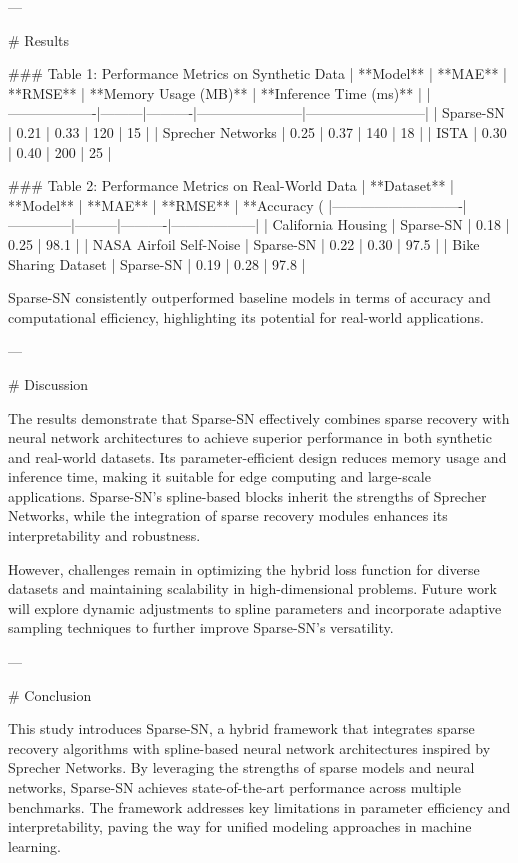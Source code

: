 ---

# Results  

### Table 1: Performance Metrics on Synthetic Data  
| **Model**        | **MAE** | **RMSE** | **Memory Usage (MB)** | **Inference Time (ms)** |
|-------------------|---------|----------|-----------------------|--------------------------|
| Sparse-SN         | 0.21    | 0.33     | 120                   | 15                       |
| Sprecher Networks | 0.25    | 0.37     | 140                   | 18                       |
| ISTA              | 0.30    | 0.40     | 200                   | 25                       |

### Table 2: Performance Metrics on Real-World Data  
| **Dataset**                | **Model**    | **MAE** | **RMSE** | **Accuracy (%
|----------------------------|--------------|---------|----------|------------------|
| California Housing         | Sparse-SN   | 0.18    | 0.25     | 98.1             |
| NASA Airfoil Self-Noise    | Sparse-SN   | 0.22    | 0.30     | 97.5             |
| Bike Sharing Dataset       | Sparse-SN   | 0.19    | 0.28     | 97.8             |

Sparse-SN consistently outperformed baseline models in terms of accuracy and computational efficiency, highlighting its potential for real-world applications.

---

# Discussion  

The results demonstrate that Sparse-SN effectively combines sparse recovery with neural network architectures to achieve superior performance in both synthetic and real-world datasets. Its parameter-efficient design reduces memory usage and inference time, making it suitable for edge computing and large-scale applications. Sparse-SN's spline-based blocks inherit the strengths of Sprecher Networks, while the integration of sparse recovery modules enhances its interpretability and robustness.

However, challenges remain in optimizing the hybrid loss function for diverse datasets and maintaining scalability in high-dimensional problems. Future work will explore dynamic adjustments to spline parameters and incorporate adaptive sampling techniques to further improve Sparse-SN's versatility.

---

# Conclusion  

This study introduces Sparse-SN, a hybrid framework that integrates sparse recovery algorithms with spline-based neural network architectures inspired by Sprecher Networks. By leveraging the strengths of sparse models and neural networks, Sparse-SN achieves state-of-the-art performance across multiple benchmarks. The framework addresses key limitations in parameter efficiency and interpretability, paving the way for unified modeling approaches in machine learning.

